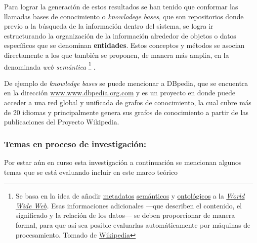 \documentclass[
  10,
  openany]{book}
\begin{document}
Para lograr la generación de estos resultados se han tenido que conformar las llamadas bases de conocimiento o \emph{knowlodege bases}, que son repositorios donde previo a la búsqueda de la información dentro del sistema, se logra ir estructurando la organización de la información alrededor de objetos o datos específicos que se denominan \textbf{entidades}. Estos conceptos y métodos se asocian directamente a los que también se proponen, de manera más amplia, en la denominada \emph{web semántica} \footnote{Se basa en la idea de añadir \href{https://es.wikipedia.org/wiki/Metadato}{metadatos} \href{https://es.wikipedia.org/wiki/Sem\%C3\%A1ntica}{semánticos} y \href{https://es.wikipedia.org/wiki/Ontolog\%C3\%ADa_(Inform\%C3\%A1tica)}{ontológicos} a la \href{https://es.wikipedia.org/wiki/World_Wide_Web}{\emph{World Wide Web}}\emph{.} Esas informaciones adicionales ---que describen el contenido, el significado y la relación de los datos--- se deben proporcionar de manera formal, para que así sea posible evaluarlas automáticamente por máquinas de procesamiento. Tomado de \href{https://es.wikipedia.org/wiki/Web_sem\%C3\%A1ntica}{Wikipedia}} .

De ejemplo de \emph{knowledge bases} se puede mencionar a DBpedia, que se encuentra en la dirección \href{www.dbpedia.com}{www.www.dbpedia.org.com} y es un proyecto en donde puede acceder a una red global y unificada de grafos de conocimiento, la cual cubre más de 20 idiomas y principalmente genera sus grafos de conocimiento a partir de las publicaciones del Proyecto Wikipedia.

\hypertarget{temas-en-proceso-de-investigaciuxf3n}{%
\subsubsection{Temas en proceso de investigación:}\label{temas-en-proceso-de-investigaciuxf3n}}

Por estar aún en curso esta investigación a continuación se mencionan algunos temas que se está evaluando incluir en este marco teórico
\end{document}
